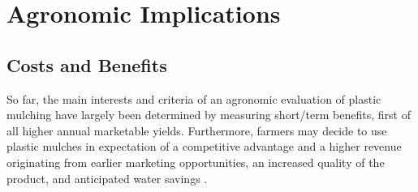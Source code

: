 \section{Agronomic Implications}
\label{sec:plastic-mulching:agronomic-implications}

\subsection{Costs and Benefits}

So far, the main interests and criteria of an agronomic evaluation of plastic mulching have largely been determined by measuring short\-/term benefits, first of all higher annual marketable yields. Furthermore, farmers may decide to use plastic mulches in expectation of a competitive advantage and a higher revenue originating from earlier marketing opportunities, an increased quality of the product, and anticipated water savings \citep{IngmanAgricultural2015,JohnsonWeed2005,KwabiahPerformance2003}.

